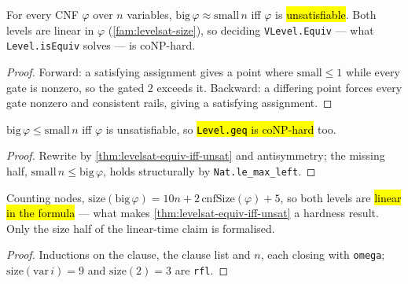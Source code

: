 \begin{theorem}
\label{thm:levelsat-equiv-iff-unsat}
\leanok
{}

 For every CNF $\varphi$ over $n$ variables, $\mathrm{big}\,\varphi \approx \mathrm{small}\,n$
iff $\varphi$ is \hl{unsatisfiable}.
Both levels are linear in $\varphi$ (\ref{fam:levelsat-size}), so deciding
\texttt{VLevel.Equiv} --- what \texttt{Level.isEquiv} solves --- is coNP-hard.
\end{theorem}
\begin{proof}
\leanok
{} Forward: a satisfying assignment gives a point where $\mathrm{small}\le 1$
while every gate is nonzero, so the gated $2$ exceeds it. Backward: a differing point
forces every gate nonzero and consistent rails, giving a satisfying assignment.
\end{proof}

\begin{lemma}
\label{thm:levelsat-le-iff-unsat}
\leanok
{}

 $\mathrm{big}\,\varphi \le \mathrm{small}\,n$ iff $\varphi$ is
unsatisfiable, so \hl{\texttt{Level.geq} is coNP-hard} too.
\end{lemma}
\begin{proof}
\leanok
{} Rewrite by \ref{thm:levelsat-equiv-iff-unsat} and antisymmetry; the missing
half, $\mathrm{small}\,n \le \mathrm{big}\,\varphi$, holds structurally by
\texttt{Nat.le\_max\_left}.
\end{proof}

\begin{lemma}
\label{fam:levelsat-size}
\leanok
{}

 Counting nodes,
$\mathrm{size}(\mathrm{big}\,\varphi) = 10n + 2\,\mathrm{cnfSize}(\varphi) + 5$, so both
levels are \hl{linear in the formula} --- what makes
\ref{thm:levelsat-equiv-iff-unsat} a hardness result.
 Only the size half of the linear-time claim is formalised.
\end{lemma}
\begin{proof}
\leanok
{} Inductions on the clause, the clause list and $n$, each closing with
\texttt{omega}; $\mathrm{size}(\mathrm{var}\,i)=9$ and $\mathrm{size}(2)=3$ are
\texttt{rfl}.
\end{proof}

